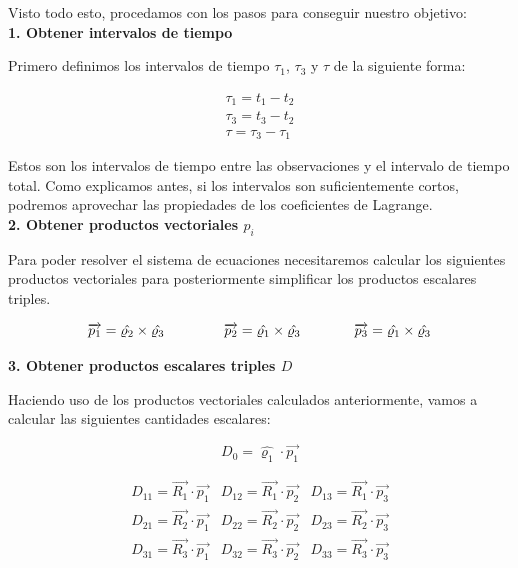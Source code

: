 \documentclass{article}
\numberwithin{equation}{section}
\begin{document}
Visto todo esto, procedamos con los pasos para conseguir nuestro objetivo:\\

\noindent\textbf{1. Obtener intervalos de tiempo}

Primero definimos los intervalos de tiempo $\tau_1$, $\tau_3$ y $\tau$ de la siguiente forma:

\begin{align}
    \tau_1= t_1-t_2 \\
    \tau_3= t_3-t_2 \\
    \tau= \tau_3-\tau_1
\end{align}

Estos son los intervalos de tiempo entre las observaciones y el intervalo de tiempo total. Como explicamos antes, si los intervalos son suficientemente cortos, podremos aprovechar las propiedades de los coeficientes de Lagrange.\\

\noindent\textbf{2. Obtener productos vectoriales $p_i$}

Para poder resolver el sistema de ecuaciones necesitaremos calcular los siguientes productos vectoriales para posteriormente simplificar los productos escalares triples.

\begin{align}
    \overrightarrow{p_1}=\hat{\varrho_2}\times\hat{\varrho_3} \hspace{1.5cm} & \overrightarrow{p_2}=\hat{\varrho_1}\times\hat{\varrho_3} \hspace{1cm} & \overrightarrow{p_3}=\hat{\varrho_1}\times\hat{\varrho_3}
\end{align}

\noindent\textbf{3. Obtener productos escalares triples $D$}

Haciendo uso de los productos vectoriales calculados anteriormente, vamos a calcular las siguientes cantidades escalares:

\begin{equation}
    D_0=\hat{\varrho_1}\cdot\overrightarrow{p_1}
\end{equation}

\begin{equation}
\begin{array}{ccc}
D_{11} = \overrightarrow{R_1} \cdot \overrightarrow{p_1} & D_{12} = \overrightarrow{R_1} \cdot \overrightarrow{p_2} & D_{13} = \overrightarrow{R_1} \cdot \overrightarrow{p_3} \\
D_{21} = \overrightarrow{R_2} \cdot \overrightarrow{p_1} & D_{22} = \overrightarrow{R_2} \cdot \overrightarrow{p_2} & D_{23} = \overrightarrow{R_2} \cdot \overrightarrow{p_3} \\
D_{31} = \overrightarrow{R_3} \cdot \overrightarrow{p_1} & D_{32} = \overrightarrow{R_3} \cdot \overrightarrow{p_2} & D_{33} = \overrightarrow{R_3} \cdot \overrightarrow{p_3}
\end{array}
\end{equation}
\end{document}
